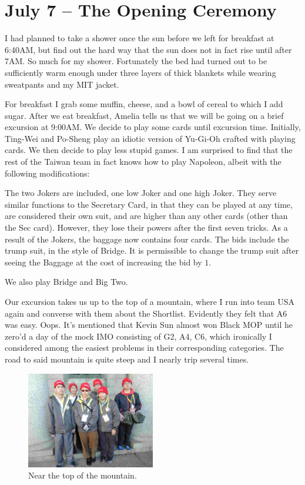 \documentclass[11pt]{scrreprt}
\numberwithin{figure}{chapter}
\begin{document}
\section{July 7 -- The Opening Ceremony}
I had planned to take a shower once the sun before we left for breakfast at 6:40AM, but find out the hard way
that the sun does not in fact rise until after 7AM.
So much for my shower.
Fortunately the bed had turned out to be sufficiently warm enough under three layers of thick blankets
while wearing sweatpants and my MIT jacket.

For breakfast I grab some muffin, cheese, and a bowl of cereal to which I add sugar.
After we eat breakfast, Amelia tells us that we will be going on a brief excursion at 9:00AM.
We decide to play some cards until excursion time.
Initially, Ting-Wei and Po-Sheng play an idiotic version of Yu-Gi-Oh crafted with playing cards.
We then decide to play less stupid games.
I am surprised to find that the rest of the Taiwan team in fact knows how to play Napoleon, albeit
with the following modifications:
\begin{itemize}
  \ii The two Jokers are included, one low Joker and one high Joker.
  They serve similar functions to the Secretary Card, in that they can be played at any time,
  are considered their own suit, and are higher than any other cards (other than the Sec card).
  However, they lose their powers after the first seven tricks.
  \ii As a result of the Jokers, the baggage now contains four cards.
  \ii The bids include the trump suit, in the style of Bridge.
  It is permissible to change the trump suit after seeing the Baggage at the cost
  of increasing the bid by $1$.
\end{itemize}
We also play Bridge and Big Two.

Our excursion takes us up to the top of a mountain, where I run into team USA again and converse
with them about the Shortlist. Evidently they felt that A6 was easy. Oops.
It's mentioned that Kevin Sun almost won Black MOP until he zero'd a day of the mock IMO consisting
of G2, A4, C6, which ironically I considered among the easiest problems in their corresponding categories.
The road to said mountain is quite steep and I nearly trip several times.

\begin{figure}[ht]
  \centering
  \includegraphics[width=0.5\textwidth]{media/mini_excursion.jpg}
  \caption{Near the top of the mountain.}
\end{figure}
\end{document}
